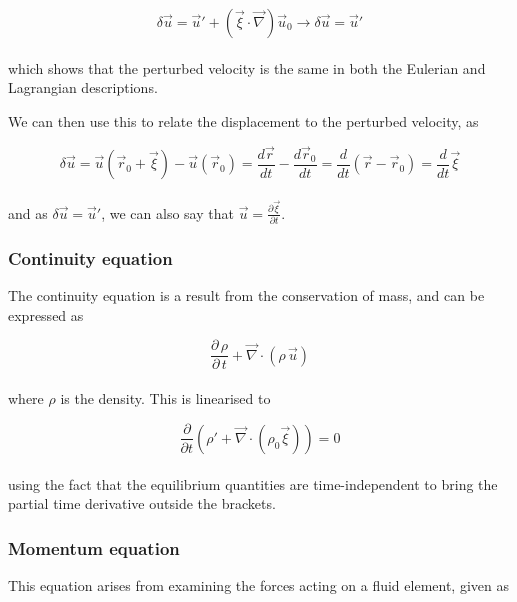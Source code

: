 \documentclass[11pt]{amsart}
\begin{document}
\begin{equation}
\delta \vec{u} = \vec{u}' + (\vec{\xi} \cdot \vec{\nabla}) \vec{u}_{0} \longrightarrow \delta \vec{u} = \vec{u}'
\end{equation}
\\
which shows that the perturbed velocity is the same in both the Eulerian and Lagrangian descriptions.

We can then use this to relate the displacement to the perturbed velocity, as

\begin{equation}
\delta \vec{u} = \vec{u}(\vec{r}_{0} + \vec{\xi}) - \vec{u}(\vec{r}_{0}) = \frac{d\vec{r}}{dt} - \frac{d\vec{r}_{0}}{dt}
= \frac{d}{dt} \left( \vec{r} - \vec{r}_{0} \right) = \frac{d}{dt} \vec{\xi}
\end{equation}
\\
and as $\delta\vec{u} = \vec{u}'$, we can also say that $\vec{u} = \frac{\partial \vec{\xi}}{\partial t}$.






\subsubsection{Continuity equation}

The continuity equation is a result from the conservation of mass, and can be expressed as

\begin{equation} \frac{\partial \, \rho}{\partial \, t} + \vec{\nabla} \cdot ( \rho \, \vec{u} )
\end{equation}
\\
where $\rho$ is the density.  This is linearised to

\begin{equation}
\frac{\partial}{\partial t} \left( \rho' + \vec{\nabla} \cdot \left( \rho_{0} \vec{\xi} \right) \right) = 0
\end{equation}
\\
using the fact that the equilibrium quantities are time-independent to bring the partial time
derivative outside the brackets.



\subsubsection{Momentum equation}

This equation arises from examining the forces acting on a fluid element, given as
\end{document}
